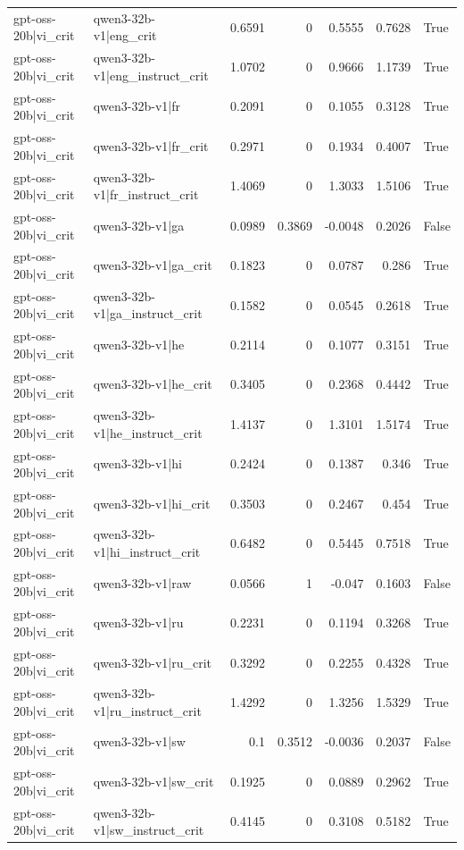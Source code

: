 \begin{table}
\begin{tabular}{l l r r r r l}
gpt-oss-20b|vi_crit & qwen3-32b-v1|eng_crit & 0.6591 & 0 & 0.5555 & 0.7628 & True \\
gpt-oss-20b|vi_crit & qwen3-32b-v1|eng_instruct_crit & 1.0702 & 0 & 0.9666 & 1.1739 & True \\
gpt-oss-20b|vi_crit & qwen3-32b-v1|fr & 0.2091 & 0 & 0.1055 & 0.3128 & True \\
gpt-oss-20b|vi_crit & qwen3-32b-v1|fr_crit & 0.2971 & 0 & 0.1934 & 0.4007 & True \\
gpt-oss-20b|vi_crit & qwen3-32b-v1|fr_instruct_crit & 1.4069 & 0 & 1.3033 & 1.5106 & True \\
gpt-oss-20b|vi_crit & qwen3-32b-v1|ga & 0.0989 & 0.3869 & -0.0048 & 0.2026 & False \\
gpt-oss-20b|vi_crit & qwen3-32b-v1|ga_crit & 0.1823 & 0 & 0.0787 & 0.286 & True \\
gpt-oss-20b|vi_crit & qwen3-32b-v1|ga_instruct_crit & 0.1582 & 0 & 0.0545 & 0.2618 & True \\
gpt-oss-20b|vi_crit & qwen3-32b-v1|he & 0.2114 & 0 & 0.1077 & 0.3151 & True \\
gpt-oss-20b|vi_crit & qwen3-32b-v1|he_crit & 0.3405 & 0 & 0.2368 & 0.4442 & True \\
gpt-oss-20b|vi_crit & qwen3-32b-v1|he_instruct_crit & 1.4137 & 0 & 1.3101 & 1.5174 & True \\
gpt-oss-20b|vi_crit & qwen3-32b-v1|hi & 0.2424 & 0 & 0.1387 & 0.346 & True \\
gpt-oss-20b|vi_crit & qwen3-32b-v1|hi_crit & 0.3503 & 0 & 0.2467 & 0.454 & True \\
gpt-oss-20b|vi_crit & qwen3-32b-v1|hi_instruct_crit & 0.6482 & 0 & 0.5445 & 0.7518 & True \\
gpt-oss-20b|vi_crit & qwen3-32b-v1|raw & 0.0566 & 1 & -0.047 & 0.1603 & False \\
gpt-oss-20b|vi_crit & qwen3-32b-v1|ru & 0.2231 & 0 & 0.1194 & 0.3268 & True \\
gpt-oss-20b|vi_crit & qwen3-32b-v1|ru_crit & 0.3292 & 0 & 0.2255 & 0.4328 & True \\
gpt-oss-20b|vi_crit & qwen3-32b-v1|ru_instruct_crit & 1.4292 & 0 & 1.3256 & 1.5329 & True \\
gpt-oss-20b|vi_crit & qwen3-32b-v1|sw & 0.1 & 0.3512 & -0.0036 & 0.2037 & False \\
gpt-oss-20b|vi_crit & qwen3-32b-v1|sw_crit & 0.1925 & 0 & 0.0889 & 0.2962 & True \\
gpt-oss-20b|vi_crit & qwen3-32b-v1|sw_instruct_crit & 0.4145 & 0 & 0.3108 & 0.5182 & True \\

\end{tabular}
\end{table}
